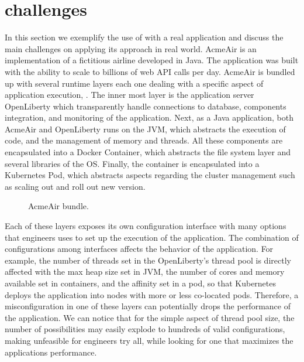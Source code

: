 \section{\name challenges}



In this section we exemplify the use of \name with a real application and
discuss the main challenges on applying its approach in real world.
AcmeAir is an
implementation of a fictitious airline developed in Java. The application was
built with the ability to scale to billions of web API calls per day. AcmeAir is
bundled up with several runtime layers each one dealing with a specific aspect
of application execution, . The inner most layer is the
application server OpenLiberty which transparently handle connections to
database, components integration, and monitoring of the application. Next, as a
Java application, both AcmeAir and OpenLiberty runs on the JVM, which abstracts
the execution of code, and the management of memory and threads. All these
components are encapsulated into a Docker Container, which abstracts the file
system layer and several libraries of the OS. Finally, the container is
encapsulated into a Kubernetes Pod, which abstracts aspects regarding the
cluster management such as scaling out and roll out new version.

\begin{figure*}[htp]
    \centering
    \def\svgwidth{\textwidth}
    \scalebox{1.0}{}
    \caption{AcmeAir bundle.}
    \label{fig:acmeair-bundle}
\end{figure*}

Each of these layers exposes its own configuration interface with many options
that engineers uses to set up the execution of the application. The combination
of configurations among interfaces affects the behavior of the application. For
example, the number of threads set in the OpenLiberty's thread pool is directly
affected with the max heap size set in JVM, the number of cores and memory
available set in containers, and the affinity set in a pod, so that Kubernetes
deploys the application into nodes with more or less co-located pods. Therefore,
a misconfiguration in one of these layers can potentially drops the performance
of the application. We can notice that for the simple aspect of thread pool
size, the number of possibilities may easily explode to hundreds of valid
configurations, making unfeasible for engineers try all, while looking for one
that maximizes the applications performance.


